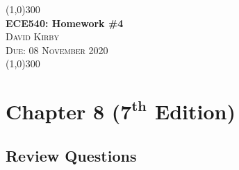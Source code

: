 \documentclass[12pt]{article}
\begin{document}
 	\begin{center}
    \line(1,0){300}\\[0.25cm]
 	\Large{\bfseries ECE540: Homework \#4}\\
 	\textsc{\large David Kirby}\\
 	\textsc{\large Due: 08 November 2020}\\
 	\line(1,0){300}\\[0.75cm]
 	\end{center}
\section*{Chapter 8 (\(\bm{7^{th}}\) Edition)}
\subsection*{Review Questions}
\end{document}
